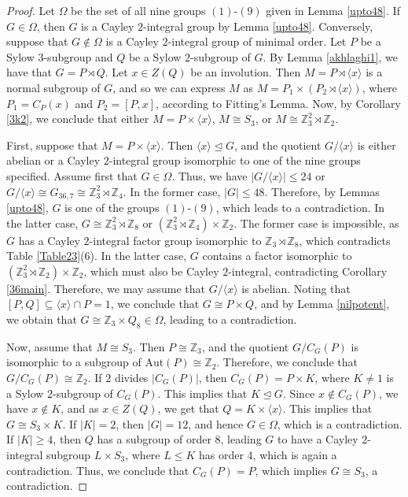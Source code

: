 \documentclass{amsart}
\def \leq {\leqslant}
\def \geq {\geqslant}
\begin{document}
\begin{proof}
	Let $\Omega$ be the set of all nine groups $(1)$-$(9)$ given in Lemma \ref{upto48}. If $G \in \Omega$, then $G$ is a Cayley $2$-integral group by Lemma \ref{upto48}. Conversely, suppose that $G \notin \Omega$ is a Cayley $2$-integral group of minimal order. Let $P$ be a Sylow $3$-subgroup and $Q$ be a Sylow $2$-subgroup of $G$. By Lemma \ref{akhlaghi1}, we have that $G = P \rtimes Q$. Let $x \in Z(Q)$ be an involution. Then $M = P \rtimes \langle x \rangle$ is a normal subgroup of $G$, and so we can express $M$ as $M = P_1 \times (P_2 \rtimes \langle x \rangle)$, where $P_1 = C_P(x)$ and $P_2 = [P,x]$, according to Fitting's Lemma. Now, by Corollary \ref{3k2}, we conclude that either $M = P \times \langle x \rangle$, $M \cong S_3$, or $M \cong \mathbb{Z}_3^2 \rtimes \mathbb{Z}_2$. 
	
	First, suppose that $M = P \times \langle x \rangle$. Then $\langle x \rangle \unlhd G$, and the quotient $G/\langle x \rangle$ is either abelian or a Cayley $2$-integral group isomorphic to one of the nine groups specified. Assume first that $G \in \Omega$. Thus, we have $|G/\langle x \rangle| \leq 24$ or $G/\langle x \rangle \cong G_{36,7} \cong \mathbb{Z}_3^2 \rtimes \mathbb{Z}_4$. In the former case, $|G| \leq 48$. Therefore, by Lemmas \ref{upto48}, $G$ is one of the groups $(1)$-$(9)$, which leads to a contradiction. In the latter case, $G \cong \mathbb{Z}_3^2 \rtimes \mathbb{Z}_8$ or $(\mathbb{Z}_3^2 \rtimes \mathbb{Z}_4) \times \mathbb{Z}_2$. The former case is impossible, as $G$ has a Cayley $2$-integral factor group isomorphic to $\mathbb{Z}_3 \rtimes \mathbb{Z}_8$, which contradicts Table \ref{Table23}(6). In the latter case, $G$ contains a factor isomorphic to $(\mathbb{Z}_3^2 \rtimes \mathbb{Z}_2) \times \mathbb{Z}_2$, which must also be Cayley $2$-integral, contradicting Corollary \ref{36main}. Therefore, we may assume that $G/\langle x \rangle$ is abelian. Noting that $[P,Q]\subseteq \langle x\rangle \cap P=1$, we conclude  that $G \cong P \times Q$, and by Lemma \ref{nilpotent}, we obtain that $G \cong \mathbb{Z}_3 \times Q_8 \in \Omega$, leading to a contradiction.
	
	Now,  assume that $M \cong S_3$. Then $P \cong \mathbb{Z}_3$, and the quotient $G/C_G(P)$ is isomorphic to a subgroup of $\text{Aut}(P) \cong \mathbb{Z}_2$. Therefore, we conclude that $G/C_G(P) \cong \mathbb{Z}_2$. If $2$ divides $|C_G(P)|$, then $C_G(P) = P \times K$, where $K \neq 1$ is a Sylow $2$-subgroup of $C_G(P)$. This implies that $K \unlhd G$. Since $x \notin C_G(P)$, we have $x \notin K$, and as $x \in Z(Q)$, we get that $Q = K \times \langle x \rangle$. This implies that $G \cong S_3 \times K$. If $|K| = 2$, then $|G| = 12$, and hence $G \in \Omega$, which is a contradiction. If $|K| \geq 4$, then $Q$ has a subgroup of order $8$, leading $G$ to have a Cayley $2$-integral subgroup $L \times S_3$, where $L \leq K$ has order $4$, which is again a contradiction. Thus, we conclude that $C_G(P) = P$, which implies $G \cong S_3$, a contradiction.
	

\end{proof}
\end{document}
